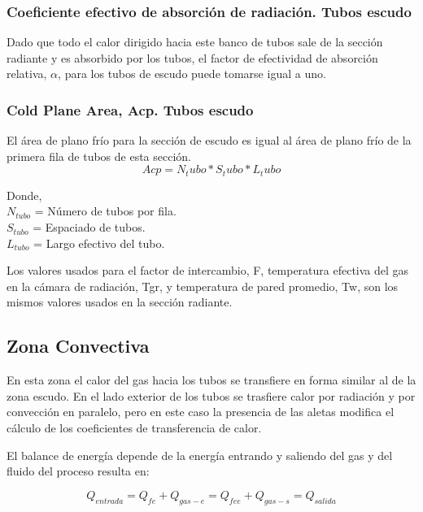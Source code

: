 \subsubsection{Coeficiente efectivo de absorción de radiación. Tubos escudo}
\par Dado que todo el calor dirigido hacia este banco de tubos sale de la sección radiante y es absorbido por los tubos, el factor de efectividad de absorción relativa, $\alpha$, para los tubos de escudo puede tomarse igual a uno.

\subsubsection{Cold Plane Area, Acp. Tubos escudo}
\par El área de plano frío para la sección de escudo es igual al área de plano frío de la primera fila de tubos de esta sección.
\begin{equation*}
Acp = N_tubo * S_tubo * L_tubo
\end{equation*}
\par Donde, \\
$N_{tubo}$ = Número de tubos por fila. \\
$S_{tubo}$ = Espaciado de tubos. \\
$L_{tubo}$ = Largo efectivo del tubo.\\

\par Los valores usados para el factor de intercambio, F, temperatura efectiva del gas en la cámara de radiación, Tgr, y temperatura de pared promedio, Tw, son los mismos valores usados en la sección radiante.

\subsection{Zona Convectiva}
\par En esta zona el calor del gas hacia los tubos se transfiere en forma similar al de la zona escudo. En el lado exterior de los tubos se trasfiere calor por radiación y por convección en paralelo, pero en este caso la presencia de las aletas modifica el cálculo de los coeficientes de transferencia de calor.

\par El balance de energía depende de la energía entrando y saliendo del gas y del fluido del proceso resulta en:

\begin{equation}
\label{eq:conv}
Q_{entrada} = Q_{fe} + Q_{gas-e} = Q_{fee} + Q_{gas-s} = Q_{salida}
\end{equation}

